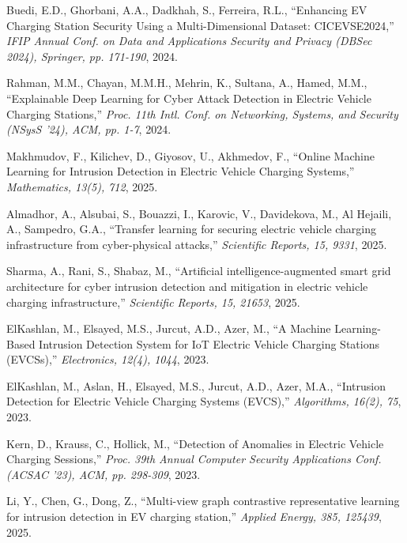 
Buedi, E.D., Ghorbani, A.A., Dadkhah, S., Ferreira, R.L.,
``Enhancing EV Charging Station Security Using a Multi-Dimensional Dataset: CICEVSE2024,''
\textit{IFIP Annual Conf. on Data and Applications Security and Privacy (DBSec 2024), Springer, pp. 171-190}, 2024.

Rahman, M.M., Chayan, M.M.H., Mehrin, K., Sultana, A., Hamed, M.M.,
``Explainable Deep Learning for Cyber Attack Detection in Electric Vehicle Charging Stations,''
\textit{Proc. 11th Intl. Conf. on Networking, Systems, and Security (NSysS '24), ACM, pp. 1-7}, 2024.

Makhmudov, F., Kilichev, D., Giyosov, U., Akhmedov, F.,
``Online Machine Learning for Intrusion Detection in Electric Vehicle Charging Systems,''
\textit{Mathematics, 13(5), 712}, 2025.

Almadhor, A., Alsubai, S., Bouazzi, I., Karovic, V., Davidekova, M., Al Hejaili, A., Sampedro, G.A.,
``Transfer learning for securing electric vehicle charging infrastructure from cyber-physical attacks,''
\textit{Scientific Reports, 15, 9331}, 2025.

Sharma, A., Rani, S., Shabaz, M.,
``Artificial intelligence-augmented smart grid architecture for cyber intrusion detection and mitigation in electric vehicle charging infrastructure,''
\textit{Scientific Reports, 15, 21653}, 2025.

ElKashlan, M., Elsayed, M.S., Jurcut, A.D., Azer, M.,
``A Machine Learning-Based Intrusion Detection System for IoT Electric Vehicle Charging Stations (EVCSs),''
\textit{Electronics, 12(4), 1044}, 2023.

ElKashlan, M., Aslan, H., Elsayed, M.S., Jurcut, A.D., Azer, M.A.,
``Intrusion Detection for Electric Vehicle Charging Systems (EVCS),''
\textit{Algorithms, 16(2), 75}, 2023.

Kern, D., Krauss, C., Hollick, M.,
``Detection of Anomalies in Electric Vehicle Charging Sessions,''
\textit{Proc. 39th Annual Computer Security Applications Conf. (ACSAC '23), ACM, pp. 298-309}, 2023.

Li, Y., Chen, G., Dong, Z.,
``Multi-view graph contrastive representative learning for intrusion detection in EV charging station,''
\textit{Applied Energy, 385, 125439}, 2025.

